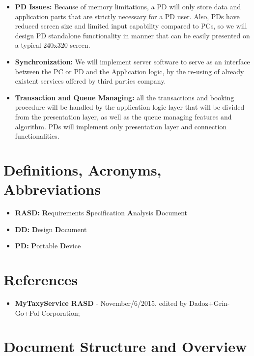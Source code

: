 \documentclass[10pt,a4paper]{report}
\begin{document}
\begin{itemize}
\item \textbf{PD Issues:} Because of memory limitations, a PD will only store data and application parts that are strictly necessary for a PD user. Also, PDs have reduced screen size and limited input capability compared to PCs, so we will design PD standalone functionality in manner that can be easily presented on a typical 240x320 screen.

\item \textbf{Synchronization:} We will implement server software to serve as an interface between the PC or PD and the Application logic, by the re-using of already existent services offered by third parties company.

\item \textbf{Transaction and Queue Managing:} all the transactions and booking procedure will be handled by the application logic layer that will be divided from the presentation layer, as well as the queue managing features and algorithm. PDs will implement only presentation layer and connection functionalities.
\end{itemize}

\section{Definitions, Acronyms, Abbreviations}
\begin{itemize}
\item{\textbf{RASD:}} \textbf{R}equirements \textbf{S}pecification \textbf{A}nalysis \textbf{D}ocument
\item{\textbf{DD:}} \textbf{D}esign \textbf{D}ocument
\item{\textbf{PD:}} \textbf{P}ortable \textbf{D}evice
\end{itemize}
\section{References}
\begin{itemize}
\item{\textbf{MyTaxyService RASD}} - November/6/2015, edited by Dadoz+Grin-Go+Pol Corporation;
\end{itemize}
\section{Document Structure and Overview}
\end{document}
